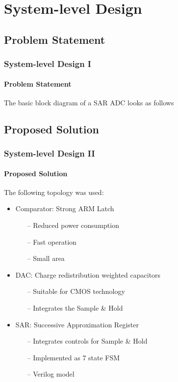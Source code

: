 \documentclass{beamer}
\begin{document}

  \section{System-level Design}
  \subsection{Problem Statement}
  \begin{frame}
    \frametitle{System-level Design I}
    \framesubtitle{Problem Statement}
    The basic block diagram of a SAR ADC looks as follows

    \vspace*{2em}
    \resizebox{\textwidth}{!}{}
  \end{frame}

  \subsection{Proposed Solution}
  \begin{frame}
    \frametitle{System-level Design II}
    \framesubtitle{Proposed Solution}
    The following topology was used:
    \vspace{1em}
    \begin{itemize}
      \item Comparator: \alert{Strong ARM Latch}
      \begin{itemize}
        \item[--] Reduced power consumption 
        \item[--] Fast operation
        \item[--] Small area
      \end{itemize}
      \item<2-> DAC: \alert{Charge redistribution weighted capacitors}
      \begin{itemize}
        \item[--] Suitable for CMOS technology
        \item[--] Integrates the Sample \& Hold
      \end{itemize}
      \item<3-> SAR: \alert{Successive Approximation Register}
      \begin{itemize}
        \item[--] Integrates controls for Sample \& Hold
        \item[--] Implemented as 7 state FSM
        \item[--] Verilog model
      \end{itemize}
    \end{itemize}
  \end{frame}
\end{document}
